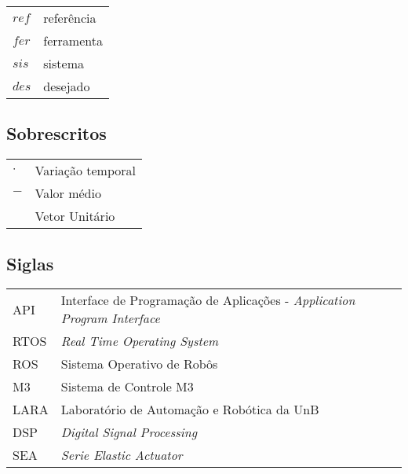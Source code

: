 \begin{tabular}{p{}p{}}
$ref$  & referência \tabularnewline
$fer$  & ferramenta \tabularnewline
$sis$  & sistema \tabularnewline
$des$  & desejado\tabularnewline
\end{tabular}


\subsection*{Sobrescritos}

\begin{tabular}{p{}p{}}
$\cdot$  & Variação temporal \tabularnewline
$-$  & Valor médio \tabularnewline
$^{}$  & Vetor Unitário \tabularnewline
\end{tabular}


\subsection*{Siglas}

\begin{tabular}{p{}p{}}
API & Interface de Programação de Aplicações - \textit{Application Program Interface}\tabularnewline
RTOS & \textit{Real Time Operating System}\tabularnewline
ROS & Sistema Operativo de Robôs\tabularnewline
M3 & Sistema de Controle M3\tabularnewline
LARA & Laboratório de Automação e Robótica da UnB\tabularnewline
DSP & \textit{Digital Signal Processing}\tabularnewline
SEA & \textit{Serie Elastic Actuator}\tabularnewline
\end{tabular}
